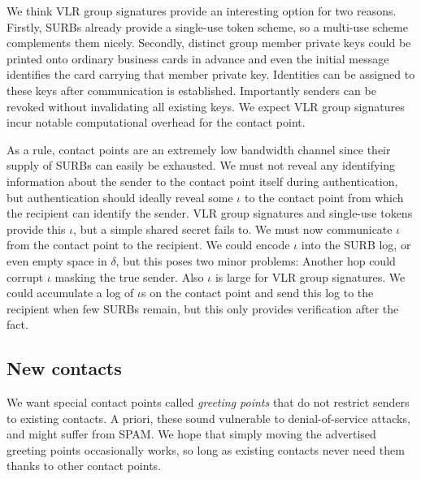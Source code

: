 We think VLR group signatures \cite{VLR} provide an interesting
option for two reasons.  Firstly, SURBs already provide a single-use
token scheme, so a multi-use scheme complements them nicely.  
Secondly, distinct group member private keys could be printed onto
ordinary business cards in advance and even the initial message
identifies the card carrying that member private key.  Identities
can be assigned to these keys after communication is established.  
Importantly senders can be revoked without invalidating all existing
keys.  We expect VLR group signatures incur notable computational
overhead for the contact point.  %

As a rule, contact points are an extremely low bandwidth channel
since their supply of SURBs can easily be exhausted.  We must not
reveal any identifying information about the sender to the contact 
point itself during authentication, but authentication should ideally
reveal some $\iota$ to the contact point from which the recipient
can identify the sender.  VLR group signatures and single-use tokens
provide this $\iota$, but a simple shared secret fails to.  We must
now communicate $\iota$ from the contact point to the recipient. 
We could encode $\iota$ into the SURB log, or even empty space in
$\delta$, but this poses two minor problems: 
 Another hop could corrupt $\iota$ masking the true sender.
 Also $\iota$ is large for VLR group signatures.  
We could accumulate a log of $\iota$s on the contact point and send
this log to the recipient when few SURBs remain, but this only
provides verification after the fact.



\subsection{New contacts}


We want special contact points called {\em greeting points} that
do not restrict senders to existing contacts.  A priori, these sound
vulnerable to denial-of-service attacks, and might suffer from SPAM.
We hope that simply moving the advertised greeting points occasionally
works, so long as existing contacts never need them thanks to other
contact points.

